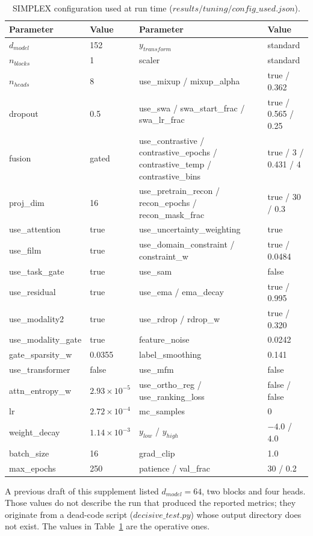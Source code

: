 \documentclass[utf8]{frontiers_suppmat}
\begin{document}
\begin{table}[h]
\centering
\caption{SIMPLEX configuration used at run time ($results/tuning/config\_used.json$).}
\label{tab:S4}
\begin{tabular}{llll}
\toprule
Parameter & Value & Parameter & Value \\
\midrule
$d_{model}$ & 152 & $y_{transform}$ & standard \\
$n_{blocks}$ & 1 & scaler & standard \\
$n_{heads}$ & 8 & use\_mixup / mixup\_alpha & true / 0.362 \\
dropout & 0.5 & use\_swa / swa\_start\_frac / swa\_lr\_frac & true / 0.565 / 0.25 \\
fusion & gated & use\_contrastive / contrastive\_epochs / contrastive\_temp / contrastive\_bins & true / 3 / 0.431 / 4 \\
proj\_dim & 16 & use\_pretrain\_recon / recon\_epochs / recon\_mask\_frac & true / 30 / 0.3 \\
use\_attention & true & use\_uncertainty\_weighting & true \\
use\_film & true & use\_domain\_constraint / constraint\_w & true / 0.0484 \\
use\_task\_gate & true & use\_sam & false \\
use\_residual & true & use\_ema / ema\_decay & true / 0.995 \\
use\_modality2 & true & use\_rdrop / rdrop\_w & true / 0.320 \\
use\_modality\_gate & true & feature\_noise & 0.0242 \\
gate\_sparsity\_w & 0.0355 & label\_smoothing & 0.141 \\
use\_transformer & false & use\_mfm & false \\
attn\_entropy\_w & $2.93 \times 10^{-5}$ & use\_ortho\_reg / use\_ranking\_loss & false / false \\
lr & $2.72 \times 10^{-4}$ & mc\_samples & 0 \\
weight\_decay & $1.14 \times 10^{-3}$ & $y_{low}$ / $y_{high}$ & $-4.0$ / $4.0$ \\
batch\_size & 16 & grad\_clip & 1.0 \\
max\_epochs & 250 & patience / val\_frac & 30 / 0.2 \\
\bottomrule
\end{tabular}
\end{table}

A previous draft of this supplement listed $d_{model} = 64$, two blocks and four heads. Those values do not describe the run that produced the reported metrics; they originate from a dead-code script ($decisive\_test.py$) whose output directory does not exist. The values in Table~\ref{tab:S4} are the operative ones.
\end{document}
